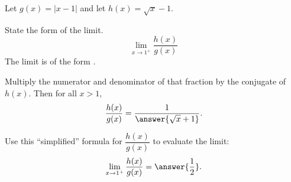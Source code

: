 \documentclass{ximera}
\begin{document}
\begin{exercise}
Let $g(x)=|x-1|$ and let $h(x)=\sqrt{x}-1$. 

\begin{exercise}
State the form of the limit.
\[
\lim_{x\to 1^{+}}\frac{h(x)}{g(x)}
\]
The limit  is of the form .
\begin{exercise}
Multiply the numerator and denominator of that fraction by the conjugate of $h(x)$. Then for all $x>1$,  
\[
\frac{h(x)}{g(x)}=\frac{1}{\answer{\sqrt{x}+1}}.
\]
\begin{exercise}
Use this ``simplified'' formula for $\dfrac{h(x)}{g(x)}$ to evaluate the limit:
\[
\lim_{x\to 1^+}\frac{h(x)}{g(x)}=\answer{\frac{1}{2}}.
\]
\end{exercise}
\end{exercise}
\end{exercise}
\end{exercise}
\end{document}
